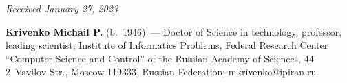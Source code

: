 \vspace*{-6pt}

\hfill{\small\textit{Received January 27, 2023}} 


\Contrl

\noindent
\textbf{Krivenko Michail P.} (b.\ 1946)~--- Doctor of Science in technology, 
professor, leading scientist, Institute of Informatics Problems, Federal Research 
Center ``Computer Science and Control'' of the Russian Academy of Sciences,  
44-2~Vavilov Str., Moscow 119333, Russian Federation; 
\mbox{mkrivenko@ipiran.ru}


\label{end\stat}

\renewcommand{\bibname}{\protect\rm Литература} 